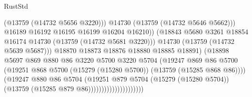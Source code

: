 \begin{lexlean}{RustStd}
\begin{coremodule}
                                                (@13759 (@14732 @5656 @3220)))
                                              @14730
                                              (@13759 (@14732 @5646 @5662)))
                                            @16189
                                            @16192
                                            @16195
                                            @16199
                                            @16204
                                            @16210))
                                        (@18843
                                          @5680
                                          @3261
                                          @18854
                                          @16174
                                          @14730
                                          (@13759 (@14732 @5681 @3220)))
                                        @14730
                                        (@13759 (@14732 @5639 @5687)))
                                      @18870
                                      @18873
                                      @18876
                                      @18880
                                      @18885
                                      @18891)
                                    (@18898
                                      @5697
                                      @869
                                      @880
                                      @86
                                      @3220
                                      @5700
                                      @3220
                                      @5704
                                      (@19247
                                        @869
                                        @86
                                        @5700
                                        (@19251
                                          @868
                                          @5700
                                          (@15279 (@15280 @5700))
                                          (@13759 (@15285 @868 @86))))
                                      (@19247
                                        @880
                                        @86
                                        @5704
                                        (@19251
                                          @879
                                          @5704
                                          (@15279 (@15280 @5704))
                                          (@13759 (@15285 @879 @86)))))))))))))))))))))

\end{coremodule}
\end{lexlean}
